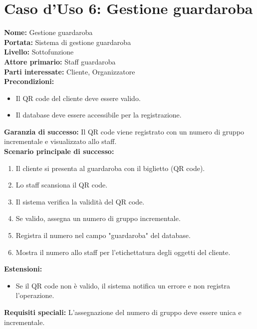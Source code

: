 \documentclass[a4paper,12pt]{article}
\begin{document}
\section*{\textcolor{sectioncolor}{Caso d'Uso 6: Gestione guardaroba}}
\textcolor{textcolor}{
\textbf{Nome:} Gestione guardaroba\\
\textbf{Portata:} Sistema di gestione guardaroba\\
\textbf{Livello:} Sottofunzione\\
\textbf{Attore primario:} Staff guardaroba\\
\textbf{Parti interessate:} Cliente, Organizzatore\\
\textbf{Precondizioni:}
\begin{itemize}
    \item Il QR code del cliente deve essere valido.
    \item Il database deve essere accessibile per la registrazione.
\end{itemize}
\textbf{Garanzia di successo:} Il QR code viene registrato con un numero di gruppo incrementale e visualizzato allo staff.\\
\textbf{Scenario principale di successo:}
\begin{enumerate}
    \item Il cliente si presenta al guardaroba con il biglietto (QR code).
    \item Lo staff scansiona il QR code.
    \item Il sistema verifica la validità del QR code.
    \item Se valido, assegna un numero di gruppo incrementale.
    \item Registra il numero nel campo "guardaroba" del database.
    \item Mostra il numero allo staff per l'etichettatura degli oggetti del cliente.
\end{enumerate}
\textbf{Estensioni:}
\begin{itemize}
    \item  Se il QR code non è valido, il sistema notifica un errore e non registra l'operazione.
\end{itemize}
\textbf{Requisiti speciali:} L'assegnazione del numero di gruppo deve essere unica e incrementale.
}
\end{document}
